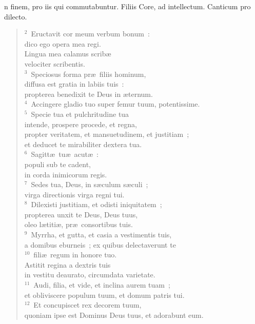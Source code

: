 \bchapter
{}n finem, pro iis qui commutabuntur. Filiis Core, ad intellectum. Canticum pro dilecto.
\begin{flushleft}\begin{verse}\vspace{6pt}${}^{2}$~Eructavit cor meum verbum bonum~:\\ dico ego opera mea regi.\\ Lingua mea calamus scrib\ae \\ velociter scribentis.\\
${}^{3}$~Speciosus forma pr\ae\ filiis hominum,\\ diffusa est gratia in labiis tuis~:\\ propterea benedixit te Deus in \ae ternum.\\
${}^{4}$~Accingere gladio tuo super femur tuum, potentissime.\\
${}^{5}$~Specie tua et pulchritudine tua\\ intende, prospere procede, et regna,\\ propter veritatem, et mansuetudinem, et justitiam~;\\ et deducet te mirabiliter dextera tua.\\
${}^{6}$~Sagitt\ae\ tu\ae\ acut\ae~:\\ populi sub te cadent,\\ in corda inimicorum regis.\\
${}^{7}$~Sedes tua, Deus, in s\ae culum s\ae culi~;\\ virga directionis virga regni tui.\\
${}^{8}$~Dilexisti justitiam, et odisti iniquitatem~;\\ propterea unxit te Deus, Deus tuus,\\ oleo l\ae titi\ae , pr\ae\ consortibus tuis.\\
${}^{9}$~Myrrha, et gutta, et casia a vestimentis tuis,\\ a domibus eburneis~; ex quibus delectaverunt te\\
${}^{10}$~fili\ae\ regum in honore tuo.\\ Astitit regina a dextris tuis\\ in vestitu deaurato, circumdata varietate.\\
${}^{11}$~Audi, filia, et vide, et inclina aurem tuam~;\\ et obliviscere populum tuum, et domum patris tui.\\
${}^{12}$~Et concupiscet rex decorem tuum,\\ quoniam ipse est Dominus Deus tuus, et adorabunt eum.\\

\end{verse}
\end{flushleft}
